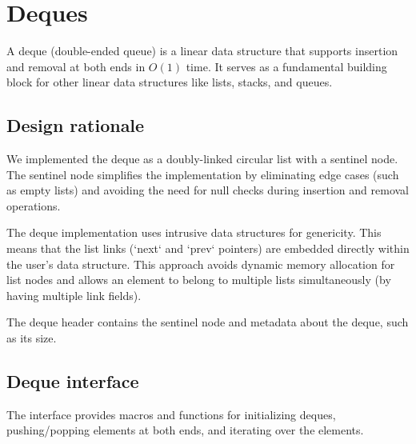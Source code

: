 \chapter{Deques}\label{chap:deques}

A deque (double-ended queue) is a linear data structure that supports insertion and removal at both ends in $O(1)$ time. It serves as a fundamental building block for other linear data structures like lists, stacks, and queues.

\section{Design rationale}

We implemented the deque as a doubly-linked circular list with a sentinel node. The sentinel node simplifies the implementation by eliminating edge cases (such as empty lists) and avoiding the need for null checks during insertion and removal operations.

The deque implementation uses intrusive data structures for genericity. This means that the list links (`next` and `prev` pointers) are embedded directly within the user's data structure. This approach avoids dynamic memory allocation for list nodes and allows an element to belong to multiple lists simultaneously (by having multiple link fields).

The deque header contains the sentinel node and metadata about the deque, such as its size.

\section{Deque interface}\label{deques:interface}

The interface provides macros and functions for initializing deques, pushing/popping elements at both ends, and iterating over the elements.

\begin{code}
  
  \caption{Interface for deques.}
\end{code}
